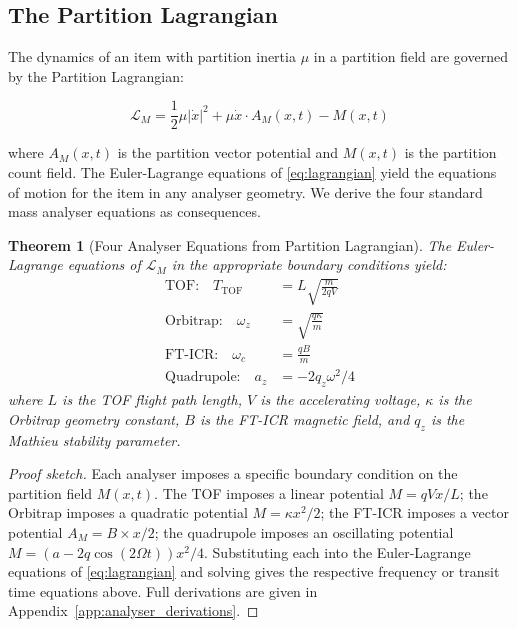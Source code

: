 \documentclass[11pt,twocolumn,a4paper]{article}
\theoremstyle{plain}
\newtheorem{theorem}{Theorem}[section]
\theoremstyle{definition}
\theoremstyle{remark}
\begin{document}
\subsection{The Partition Lagrangian}
\label{subsec:lagrangian}

The dynamics of an item with partition inertia $\mu$ in a partition field are
governed by the Partition Lagrangian:

\begin{equation}
    \mathcal{L}_M = \frac{1}{2}\mu|\dot{x}|^2 + \mu\dot{x} \cdot A_M(x,t)
    - M(x,t)
    \label{eq:lagrangian}
\end{equation}

where $A_M(x,t)$ is the partition vector potential and $M(x,t)$ is the
partition count field. The Euler-Lagrange equations of
\eqref{eq:lagrangian} yield the equations of motion for the item in any
analyser geometry. We derive the four standard mass analyser equations as
consequences.

\begin{theorem}[Four Analyser Equations from Partition Lagrangian]
\label{thm:four_analysers}
The Euler-Lagrange equations of $\mathcal{L}_M$ in the appropriate boundary
conditions yield:
\begin{align}
    \text{TOF:} \quad T_{\mathrm{TOF}} &= L\sqrt{\frac{m}{2qV}}
    \label{eq:tof} \\
    \text{Orbitrap:} \quad \omega_z &= \sqrt{\frac{q\kappa}{m}}
    \label{eq:orbitrap} \\
    \text{FT-ICR:} \quad \omega_c &= \frac{qB}{m}
    \label{eq:fticr} \\
    \text{Quadrupole:} \quad a_z &= -2q_z \omega^2 / 4
    \label{eq:quad}
\end{align}
where $L$ is the TOF flight path length, $V$ is the accelerating voltage,
$\kappa$ is the Orbitrap geometry constant, $B$ is the FT-ICR magnetic field,
and $q_z$ is the Mathieu stability parameter.
\end{theorem}

\begin{proof}[Proof sketch]
Each analyser imposes a specific boundary condition on the partition field
$M(x,t)$. The TOF imposes a linear potential $M = qVx/L$; the Orbitrap imposes
a quadratic potential $M = \kappa x^2/2$; the FT-ICR imposes a vector potential
$A_M = B \times x/2$; the quadrupole imposes an oscillating potential
$M = (a - 2q\cos(2\Omega t))x^2/4$. Substituting each into the Euler-Lagrange
equations of \eqref{eq:lagrangian} and solving gives the respective frequency
or transit time equations above. Full derivations are given in
Appendix~\ref{app:analyser_derivations}.
\end{proof}
\end{document}
